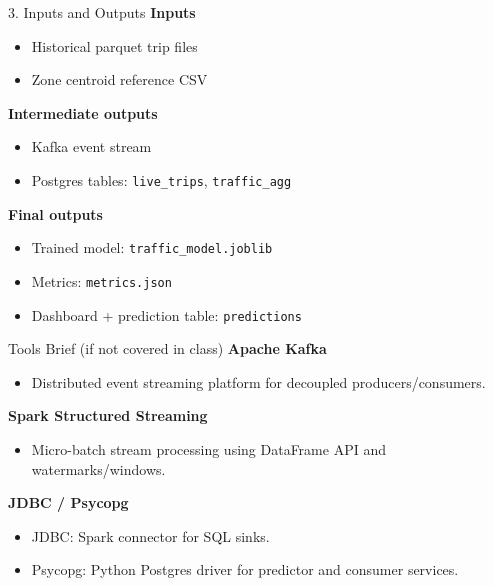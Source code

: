 \documentclass[aspectratio=169]{beamer}
\begin{document}
\begin{frame}{3. Inputs and Outputs}
\textbf{Inputs}
\begin{itemize}
  \item Historical parquet trip files
  \item Zone centroid reference CSV
\end{itemize}

\textbf{Intermediate outputs}
\begin{itemize}
  \item Kafka event stream
  \item Postgres tables: \texttt{live\_trips}, \texttt{traffic\_agg}
\end{itemize}

\textbf{Final outputs}
\begin{itemize}
  \item Trained model: \texttt{traffic\_model.joblib}
  \item Metrics: \texttt{metrics.json}
  \item Dashboard + prediction table: \texttt{predictions}
\end{itemize}
\end{frame}

\begin{frame}{Tools Brief (if not covered in class)}
\textbf{Apache Kafka}
\begin{itemize}
  \item Distributed event streaming platform for decoupled producers/consumers.
\end{itemize}
\textbf{Spark Structured Streaming}
\begin{itemize}
  \item Micro-batch stream processing using DataFrame API and watermarks/windows.
\end{itemize}
\textbf{JDBC / Psycopg}
\begin{itemize}
  \item JDBC: Spark connector for SQL sinks.
  \item Psycopg: Python Postgres driver for predictor and consumer services.
\end{itemize}
\end{frame}
\end{document}
